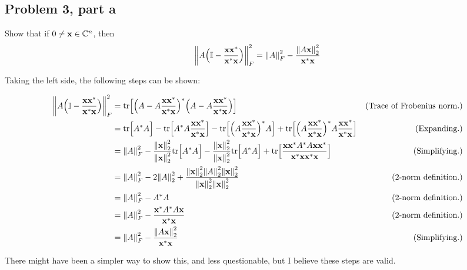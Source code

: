 \subsection{Problem 3, part a}
Show that if $0 \neq \textbf{x} \in \mathbb{C}^n$, then
\[
\norm{A\Big( \mathbb{I} - \frac{\textbf{x}\textbf{x}^*}{\textbf{x}^*\textbf{x}}\Big)}_F^2 = \norm{A}_F^2 - \frac{\norm{A\textbf{x}}_2^2}{\textbf{x}^*\textbf{x}}
\]
\partbreak
\begin{solution}

 Taking the left side, the following steps can be shown:

\vspace{-5mm}
 \alignbreak
 {\small
 \begin{align}
     \norm{A\Big( \mathbb{I} - \frac{\textbf{x}\textbf{x}^*}{\textbf{x}^*\textbf{x}}\Big)}_F^2 &= \text{tr} \Big[ \Big( A - A\frac{\textbf{x}\textbf{x}^*}{\textbf{x}^*\textbf{x}}\Big)^*\Big( A - A \frac{\textbf{x}\textbf{x}^*}{\textbf{x}^*\textbf{x}}\Big) \Big] &\text{(Trace of Frobenius norm.)}\nonumber\\
     &= \text{tr} \Big[ A^*A\Big] - \text{tr} \Big[ A^*A\frac{\textbf{x}\textbf{x}^*}{\textbf{x}^*\textbf{x}} \Big] - \text{tr} \Big[ \Big( A\frac{\textbf{x}\textbf{x}^*}{\textbf{x}^*\textbf{x}}\Big)^*A\Big] + \text{tr} \Big[ \Big(A\frac{\textbf{x}\textbf{x}^*}{\textbf{x}^*\textbf{x}} \Big)^*A\frac{\textbf{x}\textbf{x}^*}{\textbf{x}^*\textbf{x}}\Big] &\text{(Expanding.)}\nonumber\\
     &= \norm{A}_F^2 - \frac{\norm{\textbf{x}}_2^2}{\norm{\textbf{x}}_2^2}\text{tr} \Big[ A^*A\Big] - \frac{\norm{\textbf{x}}^2_2}{\norm{\textbf{x}}_2^2} \text{tr} \Big[ A^*A\Big] +  \text{tr} \Big[ \frac{\textbf{x}\textbf{x}^*A^*A\textbf{x}\textbf{x}^*}{\textbf{x}^*\textbf{x}\textbf{x}^*\textbf{x}}\Big]&\text{(Simplifying.)}\nonumber\\
     &= \norm{A}_F^2 - 2\norm{A}_2^2 + \frac{\norm{\textbf{x}}_2^2\norm{A}_2^2\norm{\textbf{x}}^2_2}{\norm{\textbf{x}}_2^2 \norm{\textbf{x}}_2^2} &\text{(2-norm definition.)}\nonumber\\
     &= \norm{A}_F^2 - A^*A &\text{(2-norm definition.)}\nonumber\\
     &= \norm{A}_F^2 - \frac{\textbf{x}^*A^*A\textbf{x}}{\textbf{x}^*\textbf{x}} &\text{(2-norm definition.)} \nonumber\\
     &= \norm{A}_F^2 - \frac{\norm{A\textbf{x}}_2^2}{\textbf{x}^*\textbf{x}} &\text{(Simplifying.)}\nonumber
 \end{align}
 }%
 \alignbreak

 There might have been a simpler way to show this, and less questionable, but I believe these steps are valid. 
\end{solution}

